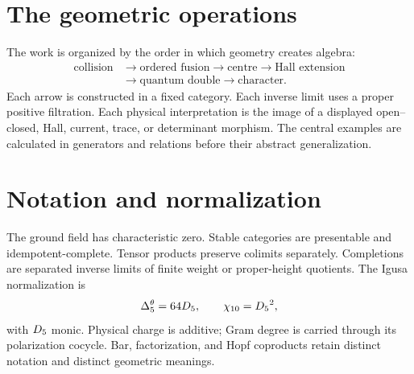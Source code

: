 \documentclass[11pt,twoside,openright]{memoir}
\begin{document}
\chapter*{The geometric operations}
The work is organized by the order in which geometry creates algebra:
\[
\begin{aligned}
\text{collision}&\longrightarrow\text{ordered fusion}\longrightarrow\text{centre}\longrightarrow\text{Hall extension}\\
&\longrightarrow\text{quantum double}\longrightarrow\text{character}.
\end{aligned}
\]
Each arrow is constructed in a fixed category.  Each inverse limit uses a proper positive filtration.  Each physical interpretation is the image of a displayed open--closed, Hall, current, trace, or determinant morphism.  The central examples are calculated in generators and relations before their abstract generalization.

\chapter*{Notation and normalization}
The ground field has characteristic zero.  Stable categories are presentable and idempotent-complete.  Tensor products preserve colimits separately.  Completions are separated inverse limits of finite weight or proper-height quotients.  The Igusa normalization is
\[
 {\Delta^{\theta}_5}=64{D_5},\qquad {\chi_{10}}={D_5}^2,
\]
with ${D_5}$ monic.  Physical charge is additive; Gram degree is carried through its polarization cocycle.  Bar, factorization, and Hopf coproducts retain distinct notation and distinct geometric meanings.

\tableofcontents
\mainmatter











\backmatter


\end{document}
